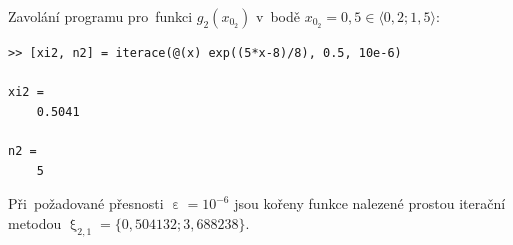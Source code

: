 \documentclass[a4paper,10pt]{article}
\def\doubleunderline#1{\underline{\underline{#1}}}
\begin{document}
\par Zavolání programu pro~funkci $g_2\left(x_{0_2}\right)$ v~bodě
$x_{0_2}=0,5 {\in} \langle{0,2}; 1,5\rangle$:

\begin{verbatim}
>> [xi2, n2] = iterace(@(x) exp((5*x-8)/8), 0.5, 10e-6)

xi2 =
    0.5041
    
n2 =
    5
\end{verbatim}

\par Při~požadované přesnosti $\upepsilon=10^{-6}$ jsou kořeny funkce nalezené prostou
iterační metodou \doubleunderline{$\upxi_{2,1}=\{0,504132; 3,688238\}$}.

\end{document}
